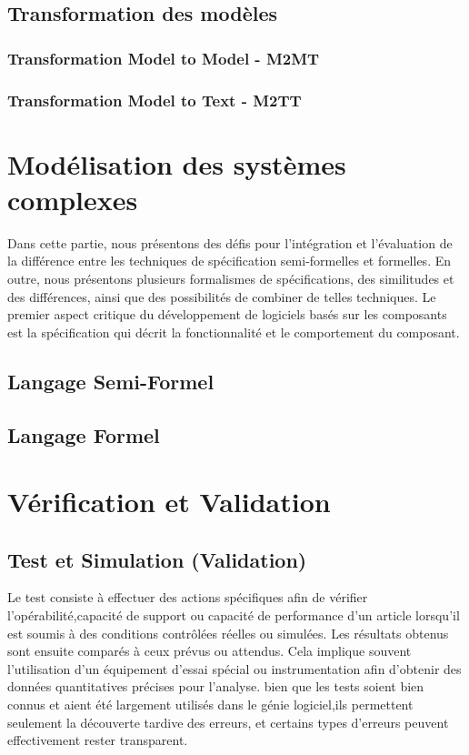 \documentclass[french]{spimufcphdthesis}
\begin{document}
\subsection{Transformation des modèles}
\subsubsection{Transformation Model to Model - M2MT}
\subsubsection{Transformation Model to Text  - M2TT}

\section{Modélisation des systèmes complexes}
 Dans cette partie, nous présentons des défis pour l'intégration et l'évaluation de la différence entre les techniques de spécification semi-formelles et formelles. En outre, nous présentons plusieurs formalismes de spécifications, des similitudes et des différences, ainsi que des possibilités de combiner de telles techniques. Le premier aspect critique du développement de logiciels basés sur les composants est la spécification qui décrit la fonctionnalité et le comportement du composant.
 
\subsection{Langage Semi-Formel}
\subsection{Langage Formel}

\section{Vérification et Validation}

\subsection{Test et Simulation (Validation)}

 Le test consiste à effectuer des actions spécifiques afin de vérifier l'opérabilité,capacité de support ou capacité de performance d'un article lorsqu'il est soumis à des conditions contrôlées réelles ou simulées. Les résultats obtenus sont ensuite comparés à ceux prévus ou attendus. Cela implique souvent l'utilisation d'un équipement d'essai spécial ou instrumentation afin d'obtenir des données quantitatives précises pour l'analyse.
bien que les tests soient bien connus et aient été largement utilisés dans le génie logiciel,ils permettent seulement la découverte tardive des erreurs, et certains types d'erreurs peuvent effectivement rester transparent.
\end{document}
